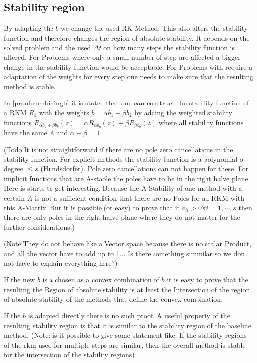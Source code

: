 \documentclass{article}
\begin{document}
\subsection{Stability region}

By adapting the $b$ we change the used RK Method. This also alters the stability function and therefore changes the region of absolute stability. 
It depends on the solved problem and the used $\Delta t$ on how many steps the stability function is altered. For Problems where only a small number of step are affected a bigger change in the stability function would be acceptable. For Problems with require a adaptation of the weights for every step one needs to make sure that the resulting method is stable.

In \ref{proof:combiningb} it is stated that one can construct the stability function of a RKM  $R_b$  with the weights $b = \alpha b_1 + \beta b_2$ by adding the weighted stability functions $R_{\alpha b_a+\beta b_b}(z) = \alpha R_{\alpha b_a}(z) + \beta R_{\beta b_b}(z) $ where all stability functions have the same $A$ and $\alpha + \beta = 1$.

(Todo:It is not straightforward if there are no pole zero cancellations in the stability function. For explicit methods the stability function is a polynomial o degree $\leq s$ (Hundsdorfer). Pole zero cancellations can not happen for these. For implicit functions that are A-stable the poles have to be in the right halve plane. Here is starts to get interesting. Because the A-Stability of one method with a certain $A$ is not a sufficient  condition that there are no Poles for all RKM with this A-Matrix. But it is possible (or easy) to prove that if $a_{ii} > 0 \forall i = 1,\cdots , s$ then there are only poles in the right halve plane where they do not matter for the further considerations.)



(Note:They do not behave like a Vector space because there is no scalar Product, and all the vector have to add up to 1... Is there something simmilar so we don not have to explain everything here?)


If the new $b$ is a chosen as a convex combination of $b$ it is easy to prove that the resulting  the Region of absolute stability is at least the Intersection of the region of absolute stability of the methods that define the convex combination. 



If the $b$ is adapted directly there is no such proof.
A useful property of the resulting stability region is that it is similar to the stability region of the baseline method. 
(Note: is it possible to give some statement like: If the stability regions of the rkm used for multiple steps are similar, then the overall method is stable for the intersection of the stability regions)
\end{document}
